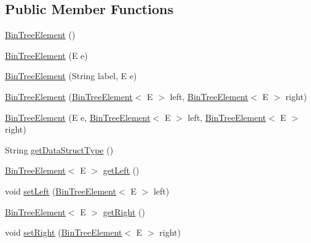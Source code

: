 \subsection*{Public Member Functions}
\begin{DoxyCompactItemize}
\item 
\hyperlink{classbridges_1_1base_1_1_bin_tree_element_ad6dbf38d53a78be561039c46bde8bc47}{Bin\+Tree\+Element} ()
\item 
\hyperlink{classbridges_1_1base_1_1_bin_tree_element_a2d31fa068f962ced8702fdb4b36c9186}{Bin\+Tree\+Element} (E e)
\item 
\hyperlink{classbridges_1_1base_1_1_bin_tree_element_aac0e300f53d5c1c89b747a1f2c5d54c9}{Bin\+Tree\+Element} (String label, E e)
\item 
\hyperlink{classbridges_1_1base_1_1_bin_tree_element_ab402fac72353087b1b93e82db007e1d7}{Bin\+Tree\+Element} (\hyperlink{classbridges_1_1base_1_1_bin_tree_element}{Bin\+Tree\+Element}$<$ E $>$ left, \hyperlink{classbridges_1_1base_1_1_bin_tree_element}{Bin\+Tree\+Element}$<$ E $>$ right)
\item 
\hyperlink{classbridges_1_1base_1_1_bin_tree_element_a37f3def3cdf4a9eccf577d0ff3c704e9}{Bin\+Tree\+Element} (E e, \hyperlink{classbridges_1_1base_1_1_bin_tree_element}{Bin\+Tree\+Element}$<$ E $>$ left, \hyperlink{classbridges_1_1base_1_1_bin_tree_element}{Bin\+Tree\+Element}$<$ E $>$ right)
\item 
String \hyperlink{classbridges_1_1base_1_1_bin_tree_element_a60fa936692e168f70fb8567090c98883}{get\+Data\+Struct\+Type} ()
\item 
\hyperlink{classbridges_1_1base_1_1_bin_tree_element}{Bin\+Tree\+Element}$<$ E $>$ \hyperlink{classbridges_1_1base_1_1_bin_tree_element_aeb6fd894af8e158c9c48dd0749d1bd22}{get\+Left} ()
\item 
void \hyperlink{classbridges_1_1base_1_1_bin_tree_element_a5bcc2c1374a49f7ab2523ce53d204c30}{set\+Left} (\hyperlink{classbridges_1_1base_1_1_bin_tree_element}{Bin\+Tree\+Element}$<$ E $>$ left)
\item 
\hyperlink{classbridges_1_1base_1_1_bin_tree_element}{Bin\+Tree\+Element}$<$ E $>$ \hyperlink{classbridges_1_1base_1_1_bin_tree_element_aa3855c26617ada7248a9d4f83cf455b7}{get\+Right} ()
\item 
void \hyperlink{classbridges_1_1base_1_1_bin_tree_element_abc40e3ed4cfaf4b74aacfd3657e89ebc}{set\+Right} (\hyperlink{classbridges_1_1base_1_1_bin_tree_element}{Bin\+Tree\+Element}$<$ E $>$ right)
\end{DoxyCompactItemize}
